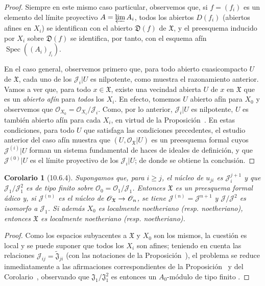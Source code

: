 \documentclass[oneside]{amsart}
\theoremstyle{ega-env-style}
\theoremstyle{ega-thm-env-style}
\newtheorem*{corollary}{Corolario}
\theoremstyle{ega-defn-env-style}
\def\geq{\geqslant}                 %
\renewcommand{\to}{\mathchoice{\longrightarrow}{\rightarrow}{\rightarrow}{\rightarrow}}
\newcommand{\oldpage}[2][]{{\marginnote{\normalfont{\textbf{#1}~|~#2}}}\ignorespaces}
\let\EGAOriginalLabel\label
\renewcommand{\label}[1]{\phantomsection\EGAOriginalLabel{#1}}
\begin{document}
\begin{proof}
Siempre en este mismo caso particular, observemos que, si $f=(f_i)$ es un elemento del límite proyectivo $A=\varprojlim A_i$, todos los abiertos $D(f_i)$ (abiertos afines en $X_i$) se identifican con el abierto $\mathfrak{D}(f)$ de $\mathfrak{X}$, y el preesquema inducido por $X_i$ sobre $\mathfrak{D}(f)$ se identifica, por tanto, con el esquema afín $\operatorname{Spec}((A_i)_{f_i})$.

En el caso general, observemos primero que, para todo abierto cuasicompacto $U$ de $\mathfrak{X}$, cada uno de los $\mathscr{J}_i|U$ es nilpotente, como muestra el razonamiento anterior.
Vamos a ver que, para todo $x\in\mathfrak{X}$, existe una vecindad abierta $U$ de $x$ en $\mathfrak{X}$ que es un \emph{abierto afín} para \emph{todos} los $X_i$.
En efecto, tomemos $U$ abierto afín para $X_0$ y observemos que $\mathscr{O}_{X_0}=\mathscr{O}_{X_i}/\mathscr{J}_i$.
Como, por lo anterior, $\mathscr{J}_i|U$ es nilpotente, $U$ es también abierto afín para cada $X_i$, en virtud de la Proposición~.
En estas condiciones, para todo $U$ que satisfaga las condiciones precedentes, el estudio anterior del caso afín muestra que $(U,\mathscr{O}_{\mathfrak{X}}|U)$ es un preesquema formal cuyos $\mathscr{J}^{(i)}|U$ forman un sistema fundamental de haces de ideales de definición, y que $\mathscr{J}^{(0)}|U$ es el límite proyectivo de los $\mathscr{J}_i|U$; de donde se obtiene la conclusión.
\end{proof}

\begin{corollary}[10.6.4]
\label{I.10.6.4}
Supongamos que, para $i\geq j$, el núcleo de $u_{ji}$ es $\mathscr{J}_i^{j+1}$ y que $\mathscr{J}_1/\mathscr{J}_1^2$
\oldpage[I]{191}
es de tipo finito sobre $\mathscr{O}_0=\mathscr{O}_1/\mathscr{J}_1$.
Entonces $\mathfrak{X}$ es un preesquema formal ádico y, si $\mathscr{J}^{(n)}$ es el núcleo de $\mathscr{O}_{\mathfrak{X}}\to\mathscr{O}_n$, se tiene $\mathscr{J}^{(n)}=\mathscr{J}^{n+1}$ y $\mathscr{J}/\mathscr{J}^2$ es isomorfo a $\mathscr{J}_1$.
Si además $X_0$ es localmente noetheriano \textup{(resp.} noetheriano), entonces $\mathfrak{X}$ es localmente noetheriano \textup{(resp.} noetheriano).
\end{corollary}

\begin{proof}
Como los espacios subyacentes a $\mathfrak{X}$ y $X_0$ son los mismos, la cuestión es local y se puede suponer que todos los $X_i$ son afines; teniendo en cuenta las relaciones $\mathscr{J}_{ij}=\widetilde{\mathfrak{J}}_{ji}$ (con las notaciones de la Proposición~), el problema se reduce inmediatamente a las afirmaciones correspondientes de la Proposición~ y del Corolario~, observando que $\mathfrak{J}_1/\mathfrak{J}_1^2$ es entonces un $A_0$-módulo de tipo finito .
\end{proof}
\end{document}
